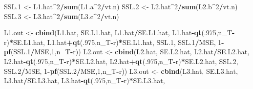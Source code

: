 \documentclass[
]{book}
\newenvironment{Shaded}{\begin{snugshade}}{\end{snugshade}}
\newcommand{\DecValTok}[1]{\textcolor[rgb]{0.00,0.00,0.81}{#1}}
\newcommand{\FloatTok}[1]{\textcolor[rgb]{0.00,0.00,0.81}{#1}}
\newcommand{\FunctionTok}[1]{\textcolor[rgb]{0.13,0.29,0.53}{\textbf{#1}}}
\newcommand{\NormalTok}[1]{#1}
\newcommand{\OtherTok}[1]{\textcolor[rgb]{0.56,0.35,0.01}{#1}}
\newcommand{\SpecialCharTok}[1]{\textcolor[rgb]{0.81,0.36,0.00}{\textbf{#1}}}
\begin{document}
\begin{Shaded}
\begin{Highlighting}[]
\NormalTok{SSL}\FloatTok{.1} \OtherTok{\textless{}{-}}\NormalTok{ L1.hat}\SpecialCharTok{\^{}}\DecValTok{2}\SpecialCharTok{/}\FunctionTok{sum}\NormalTok{(L1.a}\SpecialCharTok{\^{}}\DecValTok{2}\SpecialCharTok{/}\NormalTok{vt.n)}
\NormalTok{SSL}\FloatTok{.2} \OtherTok{\textless{}{-}}\NormalTok{ L2.hat}\SpecialCharTok{\^{}}\DecValTok{2}\SpecialCharTok{/}\FunctionTok{sum}\NormalTok{(L2.b}\SpecialCharTok{\^{}}\DecValTok{2}\SpecialCharTok{/}\NormalTok{vt.n)}
\NormalTok{SSL}\FloatTok{.3} \OtherTok{\textless{}{-}}\NormalTok{ L3.hat}\SpecialCharTok{\^{}}\DecValTok{2}\SpecialCharTok{/}\FunctionTok{sum}\NormalTok{(L3.c}\SpecialCharTok{\^{}}\DecValTok{2}\SpecialCharTok{/}\NormalTok{vt.n)}

\NormalTok{L1.out }\OtherTok{\textless{}{-}} \FunctionTok{cbind}\NormalTok{(L1.hat, SE.L1.hat, L1.hat}\SpecialCharTok{/}\NormalTok{SE.L1.hat,}
\NormalTok{                L1.hat}\SpecialCharTok{{-}}\FunctionTok{qt}\NormalTok{(.}\DecValTok{975}\NormalTok{,n\_T}\SpecialCharTok{{-}}\NormalTok{r)}\SpecialCharTok{*}\NormalTok{SE.L1.hat, }
\NormalTok{                L1.hat}\SpecialCharTok{+}\FunctionTok{qt}\NormalTok{(.}\DecValTok{975}\NormalTok{,n\_T}\SpecialCharTok{{-}}\NormalTok{r)}\SpecialCharTok{*}\NormalTok{SE.L1.hat,}
\NormalTok{                SSL}\FloatTok{.1}\NormalTok{, SSL}\FloatTok{.1}\SpecialCharTok{/}\NormalTok{MSE, }\DecValTok{1}\SpecialCharTok{{-}}\FunctionTok{pf}\NormalTok{(SSL}\FloatTok{.1}\SpecialCharTok{/}\NormalTok{MSE,}\DecValTok{1}\NormalTok{,n\_T}\SpecialCharTok{{-}}\NormalTok{r))}
\NormalTok{L2.out }\OtherTok{\textless{}{-}} \FunctionTok{cbind}\NormalTok{(L2.hat, SE.L2.hat, L2.hat}\SpecialCharTok{/}\NormalTok{SE.L2.hat,}
\NormalTok{                L2.hat}\SpecialCharTok{{-}}\FunctionTok{qt}\NormalTok{(.}\DecValTok{975}\NormalTok{,n\_T}\SpecialCharTok{{-}}\NormalTok{r)}\SpecialCharTok{*}\NormalTok{SE.L2.hat, }
\NormalTok{                L2.hat}\SpecialCharTok{+}\FunctionTok{qt}\NormalTok{(.}\DecValTok{975}\NormalTok{,n\_T}\SpecialCharTok{{-}}\NormalTok{r)}\SpecialCharTok{*}\NormalTok{SE.L2.hat,}
\NormalTok{                SSL}\FloatTok{.2}\NormalTok{, SSL}\FloatTok{.2}\SpecialCharTok{/}\NormalTok{MSE, }\DecValTok{1}\SpecialCharTok{{-}}\FunctionTok{pf}\NormalTok{(SSL}\FloatTok{.2}\SpecialCharTok{/}\NormalTok{MSE,}\DecValTok{1}\NormalTok{,n\_T}\SpecialCharTok{{-}}\NormalTok{r))}
\NormalTok{L3.out }\OtherTok{\textless{}{-}} \FunctionTok{cbind}\NormalTok{(L3.hat, SE.L3.hat, L3.hat}\SpecialCharTok{/}\NormalTok{SE.L3.hat,}
\NormalTok{                L3.hat}\SpecialCharTok{{-}}\FunctionTok{qt}\NormalTok{(.}\DecValTok{975}\NormalTok{,n\_T}\SpecialCharTok{{-}}\NormalTok{r)}\SpecialCharTok{*}\NormalTok{SE.L3.hat, }

\end{Highlighting}
\end{Shaded}
\end{document}
